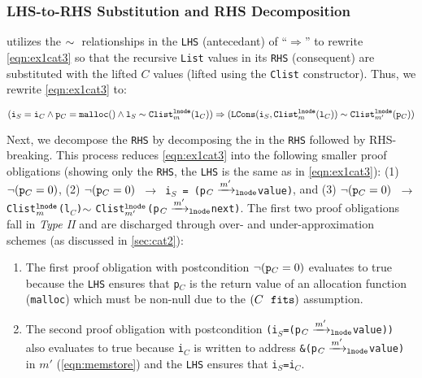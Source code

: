 \subsubsection{LHS-to-RHS Substitution and RHS Decomposition}
\toolName{} utilizes
the $\sim{}$ relationships in the {\tt LHS} (antecedant) of ``$\Rightarrow$''
to rewrite \cref{eqn:ex1cat3}
so that the recursive {\tt List} values in its {\tt RHS} (consequent)
are substituted with the lifted $C$ values (lifted using
the {\tt Clist} constructor). Thus, we
rewrite \cref{eqn:ex1cat3} to:
\vspace{-5px}
\begin{small}
\begin{equation}\label{eqn:ex2cat3}
({\tt i}_S={\tt i}_C \land {\tt p}_C={\tt malloc()} \land {\tt l}_S \sim{} {\tt Clist}_m^{{\tt lnode}}({\tt l}_C)) \Rightarrow ({\tt LCons}({\tt i}_S, {\tt Clist}_m^{{\tt lnode}}({\tt l}_C)) \sim{} {\tt Clist}_{m'}^{{\tt lnode}}({\tt p}_C))
\end{equation}
\end{small}
Next, we decompose the {\tt RHS} by decomposing the \recursiveRelation{} in the {\tt RHS}
followed by RHS-breaking. This process reduces \cref{eqn:ex1cat3} into the following
smaller proof obligations (showing only the
{\tt RHS}, the {\tt LHS} is the same as in \cref{eqn:ex1cat3}):
(1) $\neg({\tt p}_C=0)$,
(2) {\tt $\neg({\tt p}_C=0)$ $\rightarrow$ i$_S$\ =\ (p$_C\xrightarrow[]{m'}_{\mathrm{\tt lnode}}$value)}, and
(3) {\tt $\neg({\tt p}_C=0)$ $\rightarrow$ Clist$_{m}^{{\tt lnode}}$(l$_C$)$\sim{}$Clist$_{m'}^{{\tt lnode}}$(p$_C\xrightarrow[]{m'}_{\mathrm{\tt lnode}}$next)}.
The first two proof obligations fall in {\em Type II} and
are discharged through over- and under-approximation schemes (as discussed
in \cref{sec:cat2}):
\begin{enumerate}
\item The first proof obligation with
postcondition $\neg({\tt p}_C=0)$
evaluates to true because the {\tt LHS} ensures that {\tt p$_C$} is the
return value of an allocation function ({\tt malloc}) which must be
non-null due to the $(C\ \  \mathrm{\tt fits})$ assumption.
\item The second proof obligation with
postcondition {\tt (i$_S$=(p$_C\xrightarrow[]{m'}_{\mathrm{\tt lnode}}$value))}
also evaluates to true because {\tt i$_C$} is written to address {\tt \&(p$_C\xrightarrow[]{m'}_{\mathrm{\tt lnode}}$value)}
in $m'$ (\cref{eqn:memstore}) and the {\tt LHS} ensures that {\tt i$_S$=i$_C$}.
\end{enumerate}

